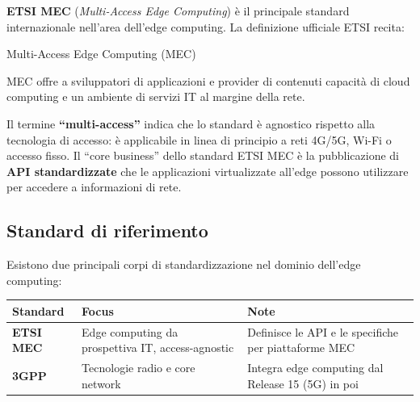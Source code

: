 \documentclass[
  italian,
  openany]{book}
\newcounter{none} %
\begin{document}
\textbf{ETSI MEC} (\emph{Multi-Access Edge Computing}) è il principale
standard internazionale nell'area dell'edge computing. La definizione
ufficiale ETSI recita:

\begin{calloutdefinition}{Multi-Access Edge Computing (MEC)}

MEC offre a sviluppatori di applicazioni e provider di contenuti
capacità di cloud computing e un ambiente di servizi IT al margine della
rete.

\end{calloutdefinition}

Il termine \textbf{``multi-access''} indica che lo standard è agnostico
rispetto alla tecnologia di accesso: è applicabile in linea di principio
a reti 4G/5G, Wi-Fi o accesso fisso. Il ``core business'' dello standard
ETSI MEC è la pubblicazione di \textbf{API standardizzate} che le
applicazioni virtualizzate all'edge possono utilizzare per accedere a
informazioni di rete.

\subsection{Standard di riferimento}\label{standard-di-riferimento}

Esistono due principali corpi di standardizzazione nel dominio dell'edge
computing:

{\def\LTcaptype{none} %
\begin{longtable}[]{@{}
  >{\raggedright\arraybackslash}p{}
  >{\raggedright\arraybackslash}p{}
  >{\raggedright\arraybackslash}p{}@{}}
\toprule\noalign{}
\begin{minipage}[b]{\linewidth}\raggedright
Standard
\end{minipage} & \begin{minipage}[b]{\linewidth}\raggedright
Focus
\end{minipage} & \begin{minipage}[b]{\linewidth}\raggedright
Note
\end{minipage} \\
\midrule\noalign{}
\endhead
\bottomrule\noalign{}
\endlastfoot
\textbf{ETSI MEC} & Edge computing da prospettiva IT, access-agnostic &
Definisce le API e le specifiche per piattaforme MEC \\
\textbf{3GPP} & Tecnologie radio e core network & Integra edge computing
dal Release 15 (5G) in poi \\
\end{longtable}
}
\end{document}
